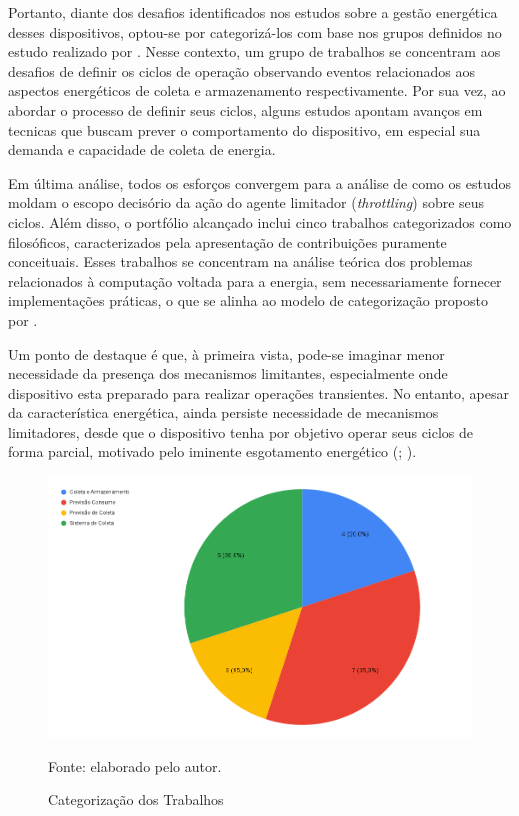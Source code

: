 Portanto, diante dos desafios identificados nos estudos sobre a gestão energética desses dispositivos, optou-se por categorizá-los com base nos grupos definidos no estudo realizado por \cite{khan_energy_2015}. Nesse contexto, um grupo de trabalhos se concentram aos desafios de definir os ciclos de operação observando eventos relacionados aos aspectos energéticos de coleta e armazenamento respectivamente. Por sua vez, ao abordar o processo de definir seus ciclos, alguns estudos apontam avanços em tecnicas que buscam prever o comportamento do dispositivo, em especial sua demanda e capacidade de coleta de energia. 

Em última análise, todos os esforços convergem para a análise de como os estudos moldam o escopo decisório da ação do agente limitador (\textit{throttling}) sobre seus ciclos. Além disso, o portfólio alcançado inclui cinco trabalhos categorizados como filosóficos, caracterizados pela apresentação de contribuições puramente conceituais. Esses trabalhos se concentram na análise teórica dos problemas relacionados à computação voltada para a energia, sem necessariamente fornecer implementações práticas, o que se alinha ao modelo de categorização proposto por .


Um ponto de destaque é que, à primeira vista, pode-se imaginar menor necessidade da presença dos mecanismos limitantes, especialmente onde dispositivo esta preparado para realizar operações transientes. No entanto, apesar da característica energética, ainda persiste necessidade de mecanismos limitadores, desde que o dispositivo tenha por objetivo operar seus ciclos de forma parcial, motivado pelo iminente esgotamento energético (\cite{merrett_energy-driven_2017}; \cite{sliper_energy-driven_2020}).

\begin{figure}[H]
	\centering	
	\caption{Categorização dos Trabalhos} 
	\label{fig:cap3:divisaodosestudos}
	\noindent\includegraphics[width=0.8\linewidth]{Imagens/cap3/classificacao.png} 
	
	Fonte: elaborado pelo autor.
\end{figure}


